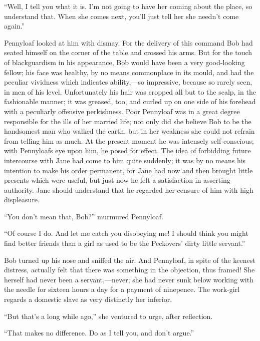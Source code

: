 ``Well, I tell you what it is. I'm not going to have her coming about
the place, so understand that. When she comes next, you'll just tell her
she needn't come again.''

Pennyloaf looked at him with dismay. For the delivery of this command
Bob had seated himself on the corner of the table and crossed his arms.
But for the touch of blackguardism in his appearance, Bob would have
been a very good-looking fellow; his face was healthy, by no means
commonplace in its mould, and had the peculiar vividness which
{}indicates ability,---so impressive, because so rarely seen, in men of
his level. Unfortunately his hair was cropped all but to the scalp, in
the fashionable manner; it was greased, too, and curled up on one side
of his forehead with a peculiarly offensive perkishness. Poor Pennyloaf
was in a great degree responsible for the ills of her married life; not
only did she believe Bob to be the handsomest man who walked the earth,
but in her weakness she could not refrain from telling him as much. At
the present moment he was intensely self-conscious; with Pennyloafs eye
upon him, he posed for effect. The idea of forbidding future intercourse
with Jane had come to him quite suddenly; it was by no means his
intention to make his order permanent, for Jane had now and then brought
little presents which were useful, but just now he felt a satisfaction
in asserting authority. Jane should understand that he regarded her
censure of him with high displeasure.

``You don't mean that, Bob?'' murmured Pennyloaf.

{}``Of course I do. And let me catch you disobeying me! I should think
you might find better friends than a girl as used to be the Peckovers'
dirty little servant.''

Bob turned up his nose and sniffed the air. And Pennyloaf, in spite of
the keenest distress, actually felt that there was something in the
objection, thus framed! She herself had never been a servant,---never;
she had never sunk below working with the needle for sixteen hours a day
for a payment of ninepence. The work-girl regards a domestic slave as
very distinctly her inferior.

``But that's a long while ago,'' she ventured to urge, after reflection.

``That makes no difference. Do as I tell you, and don't argue.''

